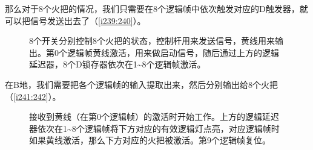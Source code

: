 那么对于8个火把的情况，我们只需要在8个逻辑帧中依次触发对应的D触发器，就可以把信号发送出去了（\autoref{i239:240}）。

\begin{figure}[!h]
\begin{center}
\qquad
{}
\end{center}
\caption{8个开关分别控制8个火把的状态，控制杆用来发送信号，黄线用来输出。第0个逻辑帧黄线激活，用来做启动信号，随后通过上方的逻辑延迟器，8个D锁存器依次在1\~{}8个逻辑帧激活。}
\label{i239:240}
\end{figure}

在B地，我们需要把各个逻辑帧的输入提取出来，然后分别输出给8个火把（\autoref{i241:242}）。

\begin{figure}[!h]
\begin{center}
\qquad
{}
\end{center}
\caption{接收到黄线（在第0个逻辑帧）的激活时开始工作。上方的逻辑延迟器依次在1\~{}8个逻辑帧将下方对应的有效逻辑灯点亮，对应逻辑帧时如果黄线激活，那么下方对应的火把被激活。第9个逻辑帧复位。}
\label{i241:242}
\end{figure}


